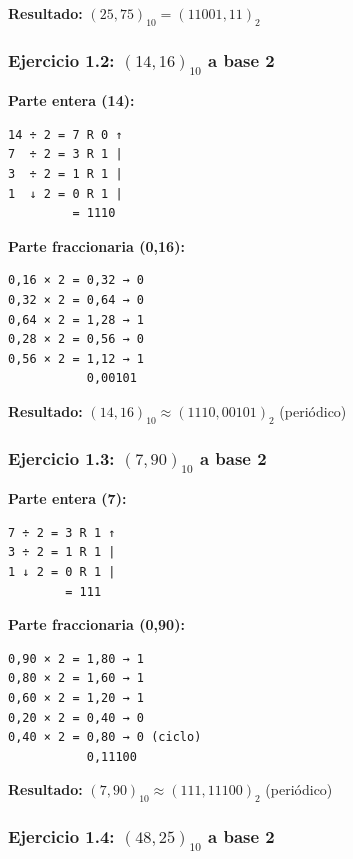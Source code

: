 \documentclass[12pt,a4paper]{article}
\begin{document}
\vspace{0.3cm}
\textbf{Resultado:} $(25,75)_{10} = (11001,11)_2$

\subsubsection{Ejercicio 1.2: $(14,16)_{10}$ a base 2}

\begin{minipage}[t]{0.48\textwidth}
\textbf{Parte entera (14):}
\begin{verbatim}
14 ÷ 2 = 7 R 0 ↑
7  ÷ 2 = 3 R 1 |
3  ÷ 2 = 1 R 1 |
1  ↓ 2 = 0 R 1 |
         = 1110
\end{verbatim}
\end{minipage}
\hfill
\begin{minipage}[t]{0.48\textwidth}
\textbf{Parte fraccionaria (0,16):}
\begin{verbatim}
0,16 × 2 = 0,32 → 0
0,32 × 2 = 0,64 → 0
0,64 × 2 = 1,28 → 1
0,28 × 2 = 0,56 → 0
0,56 × 2 = 1,12 → 1
           0,00101
\end{verbatim}
\end{minipage}

\vspace{0.3cm}
\textbf{Resultado:} $(14,16)_{10} \approx (1110,00101)_2$ (periódico)

\subsubsection{Ejercicio 1.3: $(7,90)_{10}$ a base 2}

\begin{minipage}[t]{0.48\textwidth}
\textbf{Parte entera (7):}
\begin{verbatim}
7 ÷ 2 = 3 R 1 ↑
3 ÷ 2 = 1 R 1 |
1 ↓ 2 = 0 R 1 |
        = 111
\end{verbatim}
\end{minipage}
\hfill
\begin{minipage}[t]{0.48\textwidth}
\textbf{Parte fraccionaria (0,90):}
\begin{verbatim}
0,90 × 2 = 1,80 → 1
0,80 × 2 = 1,60 → 1
0,60 × 2 = 1,20 → 1
0,20 × 2 = 0,40 → 0
0,40 × 2 = 0,80 → 0 (ciclo)
           0,11100
\end{verbatim}
\end{minipage}

\vspace{0.3cm}
\textbf{Resultado:} $(7,90)_{10} \approx (111,11100)_2$ (periódico)

\subsubsection{Ejercicio 1.4: $(48,25)_{10}$ a base 2}
\end{document}
